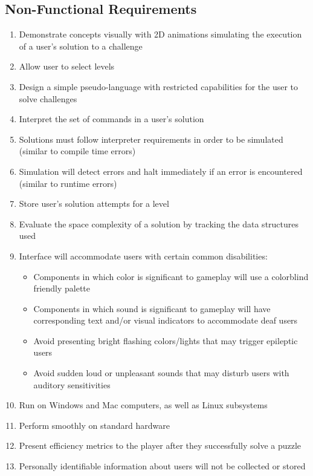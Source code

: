 \subsection{Non-Functional Requirements}
\begin{enumerate}
	\item Demonstrate concepts visually with 2D animations simulating the 
		execution of a user’s solution to a challenge
	\item Allow user to select levels
	\item Design a simple pseudo-language with restricted capabilities for the
		user to solve challenges
	\item Interpret the set of commands in a user’s solution
	\item Solutions must follow interpreter requirements in order to be simulated
		(similar to compile time errors)
	\item Simulation will detect errors and halt immediately if an error
		is encountered (similar to runtime errors)
	\item Store user’s solution attempts for a level
	\item Evaluate the space complexity of a solution by tracking the data
		structures used
	\item Interface will accommodate users with certain common disabilities:
		\begin{itemize}
		\item Components in which color is significant to gameplay will use 
			a colorblind friendly palette
		\item Components in which sound is significant to gameplay will have
			corresponding text and/or visual indicators to accommodate deaf users
		\item Avoid presenting bright flashing colors/lights that may trigger
			epileptic users
		\item Avoid sudden loud or unpleasant sounds that may disturb users with
			auditory sensitivities
		\end{itemize}
	\item Run on Windows and Mac computers, as well as Linux subsystems
	\item Perform smoothly on standard hardware
	\item Present efficiency metrics to the player after they successfully 
		solve a puzzle
	\item Personally identifiable information about users will not be collected or stored
\end{enumerate}